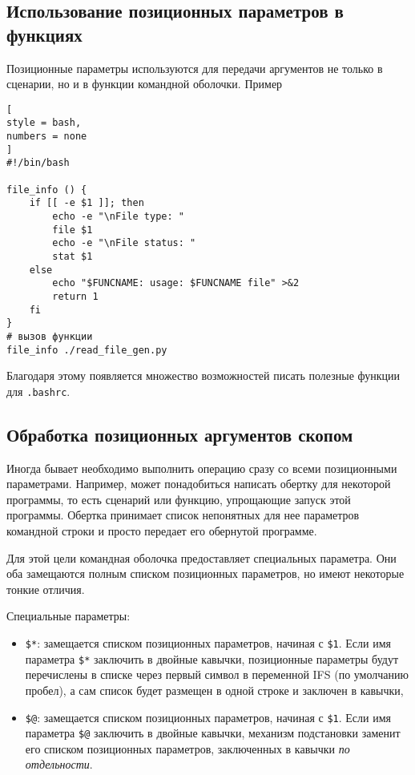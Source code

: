 \documentclass[%
	11pt,
	a4paper,
	utf8,
		]{article}
\begin{document}
\subsection{Использование позиционных параметров в функциях}

Позиционные параметры используются для передачи аргументов не только в сценарии, но и в функции командной оболочки. Пример
\begin{lstlisting}[
style = bash,
numbers = none
]
#!/bin/bash

file_info () {
    if [[ -e $1 ]]; then
        echo -e "\nFile type: "
        file $1
        echo -e "\nFile status: "
        stat $1
    else
        echo "$FUNCNAME: usage: $FUNCNAME file" >&2
        return 1
    fi
}
# вызов функции
file_info ./read_file_gen.py
\end{lstlisting}

Благодаря этому появляется множество возможностей писать полезные функции для \verb|.bashrc|.

\subsection{Обработка позиционных аргументов скопом}

Иногда бывает необходимо выполнить операцию сразу со всеми позиционными параметрами. Например, может понадобиться написать обертку для некоторой программы, то есть сценарий или функцию, упрощающие запуск этой программы. Обертка принимает список непонятных для нее параметров командной строки и просто передает его обернутой программе.

Для этой цели командная оболочка предоставляет специальных параметра. Они оба замещаются полным списком позиционных параметров, но имеют некоторые тонкие отличия.

Специальные параметры:
\begin{itemize}
	\item \verb|$*|: замещается списком позиционных параметров, начиная с \verb|$1|. Если имя параметра \verb|$*| заключить в двойные кавычки, позиционные параметры будут перечислены в списке через первый символ в переменной IFS (по умолчанию пробел), а сам список будет размещен в одной строке и заключен в кавычки,
	
	\item \verb|$@|: замещается списком позиционных параметров, начиная с \verb|$1|. Если имя параметра \verb|$@| заключить в двойные кавычки, механизм подстановки заменит его списком позиционных параметров, заключенных в кавычки \emph{по отдельности}.
\end{itemize}
\end{document}
